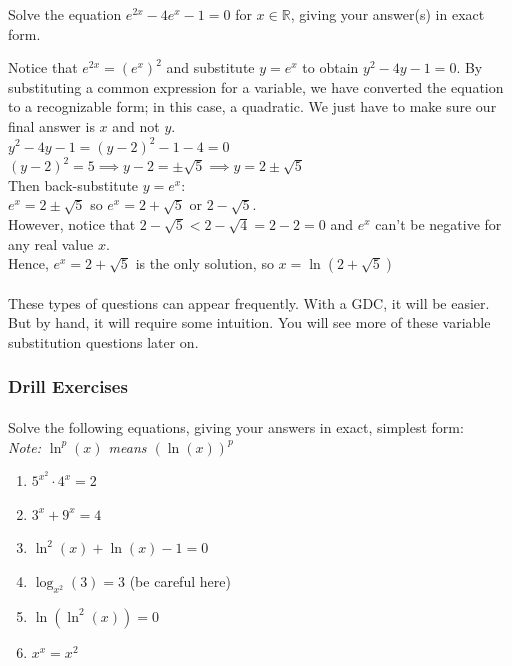 \documentclass[12pt, a4paper, titlepage, twoside]{article}
\newcommand*{\R}{\mathbb{R}}
\newcounter{excount}[subsection]
\begin{document}
	\begin{ex}
		Solve the equation $e^{2x} - 4e^x - 1 = 0$ for $x \in \R$, giving your answer(s) in exact form.
		
		\hfill
		\tcbline
		\hfill
		
		Notice that $e^{2x} = (e^x)^2$ and substitute $y = e^x$ to obtain $y^2 - 4y - 1 = 0$. By substituting a common expression
		for a variable, we have converted the equation to a recognizable form; in this case, a quadratic. We just have to make sure our
		final answer is $x$ and not $y$.\\
		
		$y^2 - 4y - 1 = (y-2)^2 - 1 - 4 = 0$\\
		$(y-2)^2 = 5 \implies y-2 = \pm \sqrt{5} \implies y = 2 \pm \sqrt{5}$\\
		
		Then back-substitute $y = e^x$:\\
		$e^x = 2 \pm \sqrt{5}$ so $e^x = 2+\sqrt{5}$ or $2 - \sqrt{5}$.\\
		
		However, notice that $2-\sqrt{5} < 2 - \sqrt{4} = 2 - 2 = 0$ and $e^x$ can't be negative for any real value $x$.\\
		
		Hence, $e^x = 2 + \sqrt{5}$ is the only solution, so $x = \ln(2+\sqrt{5})$
	\end{ex}
	
	\paragraph{}
	These types of questions can appear frequently. With a GDC, it will be easier. But by hand, it will require some intuition. You will
	see more of these variable substitution questions later on.
	
	\subsubsection*{Drill Exercises}
	
	\paragraph{}
	 Solve the following equations, giving your answers in exact, simplest form:\\
	\textit{Note: $\ln^p(x)$ means $(\ln(x))^p$}	
	
	\begin{multicols}{2}
		\begin{enumerate}[label=\textbf{(\alph*)}]
			\item $5^{x^2} \cdot 4^x = 2$ 
			\item $3^x + 9^x = 4$
			\item $\ln^2(x) + \ln(x) - 1 = 0$
			\item $\log_{x^2}(3) = 3$ (be careful here)
			\item $\ln(\ln^{2}(x)) = 0$
			\item $x^x = x^2$
		\end{enumerate}
	\end{multicols}
	
\end{document}
